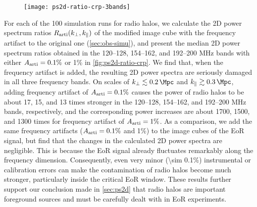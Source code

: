 \begin{figure}[htp]
  \centering
  \texttt{[image: ps2d-ratio-crp-3bands]}
  \label{fig:ps2d-ratio-crp}
\end{figure}

For each of the 100 simulation runs for radio halos, we calculate the
2D power spectrum ratios $R_{\mathrm{arti}}(k_{\perp}, k_{\parallel})$ of the modified
image cube with the frequency artifact to the original one
(\autoref{sec:obs-simu}),
and present the median 2D power spectrum ratios obtained in the
\numrange{120}{128}, \numrange{154}{162}, and \numrange{192}{200}
\si{\MHz} bands with either $A_{\mathrm{arti}} = 0.1\%$ or 1\% in
\autoref{fig:ps2d-ratio-crp}.
We find that, when the frequency artifact is added, the resulting 2D
power spectra are seriously damaged in all three frequency bands.
On scales of $\kperp \lesssim \SI{0.2}{\per\Mpc}$ and
$\klos \gtrsim \SI{0.3}{\per\Mpc}$,
adding frequency artifact of $A_{\mathrm{arti}} = 0.1\%$
causes the power of radio halos to be about 17, 15, and 13 times
stronger in the \numrange{120}{128},
\numrange{154}{162}, and \numrange{192}{200} \si{\MHz} bands,
respectively, and the corresponding power increases are about
1700, 1500, and 1300 times
for frequency artifact of $A_{\mathrm{arti}} = 1\%$.
As a comparison, we add the same frequency artifacts
($A_{\mathrm{arti}} = 0.1\%$ and 1\%) to the image
cubes of the EoR signal, but find that the changes in the calculated
2D power spectra are negligible.
This is because the EoR signal already fluctuates remarkably along
the frequency dimension.
Consequently, even very minor (\num{\sim 0.1}\%) instrumental or
calibration errors can make the contamination of radio halos
become much stronger, particularly inside the critical EoR window.
These results further support our conclusion made in \autoref{sec:ps2d}
that radio halos are important foreground sources and must be carefully
dealt with in EoR experiments.


